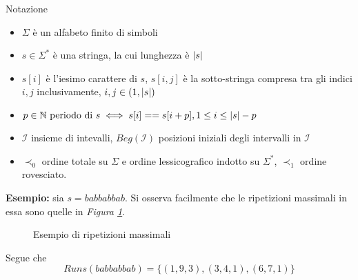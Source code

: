 \documentclass{beamer}
\begin{document}
    \begin{frame}{Notazione}
        \begin{itemize}
            \item \(\Sigma\) è un alfabeto finito di simboli
            \item \(s \in \Sigma^{*}\) è una stringa, la cui lunghezza è \(\left\lvert s \right\rvert\)
            \item \(s[i]\) è l'iesimo carattere di \(s\), 
                \(s[i,j]\) è la sotto-stringa compresa tra gli indici \(i, j\)
                inclusivamente, \(i, j \in \left\lparen 1, \left\lvert s \right\rvert \right\rparen\)
            \item \(p \in \mathbb{N} \text{ periodo di } s 
                \iff s[i] == s[i + p],  1 \le i \le \left\lvert s \right\rvert - p\) 
            \item \(\mathcal{I}\) insieme di intevalli, 
                \(Beg(\mathcal{I})\) posizioni iniziali degli intervalli in \(\mathcal{I}\)
            \item \(\prec_{0}\) ordine totale su \(\Sigma\) e ordine lessicografico
                indotto su \(\Sigma^{*}\), \(\prec_{1}\) ordine rovesciato.
        \end{itemize}
    \end{frame}

    \begin{frame}
        \textbf{Esempio: } sia \(s = babbabbab\).
        Si osserva facilmente che le ripetizioni massimali in essa sono quelle 
        in \emph{Figura \ref{fig:1}}.
        \begin{figure}[!h]
            \centering
            \caption{Esempio di ripetizioni massimali}
            \label{fig:1}
        \end{figure}
        Segue che 
            \[
                Runs(babbabbab) = \{(1, 9, 3), (3, 4, 1), (6, 7, 1)\} 
            \]
    \end{frame}
\end{document}
